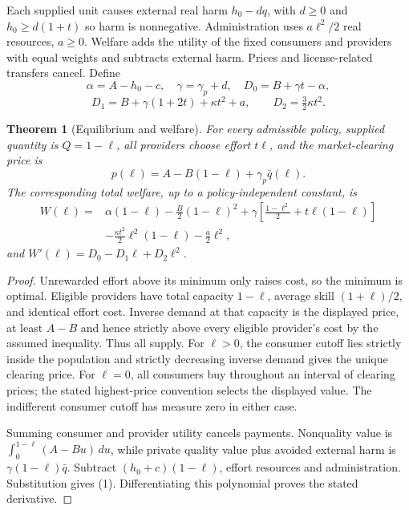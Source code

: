 \documentclass[11pt,a4paper]{article}
\newtheorem{theorem}{Theorem}[section]
\theoremstyle{definition}
\theoremstyle{remark}
\begin{document}
Each supplied unit causes external real harm $h_0-dq$, with $d\geq0$ and $h_0\geq d(1+t)$ so harm is nonnegative. Administration uses $a\ell^2/2$ real resources, $a\geq0$. Welfare adds the utility of the fixed consumers and providers with equal weights and subtracts external harm. Prices and license-related transfers cancel. Define
\[
 \alpha=A-h_0-c,\quad \gamma=\gamma_p+d,\quad
 D_0=B+\gamma t-\alpha,
\]
\[
 D_1=B+\gamma(1+2t)+\kappa t^2+a,\qquad D_2=\tfrac32\kappa t^2.
\]

\begin{theorem}[Equilibrium and welfare]
For every admissible policy, supplied quantity is $Q=1-\ell$, all providers choose effort $t\ell$, and the market-clearing price is
\[
 p(\ell)=A-B(1-\ell)+\gamma_p\bar q(\ell).
\]
The corresponding total welfare, up to a policy-independent constant, is
\[
 \begin{split}
 W(\ell)={}&\alpha(1-\ell)-\frac B2(1-\ell)^2
 +\gamma\left[\frac{1-\ell^2}{2}+t\ell(1-\ell)\right]\\
 &-\frac{\kappa t^2}{2}\ell^2(1-\ell)-\frac a2\ell^2,
 \end{split}\tag{1}
\]
and $W'(\ell)=D_0-D_1\ell+D_2\ell^2$.
\end{theorem}
\begin{proof}
Unrewarded effort above its minimum only raises cost, so the minimum is optimal. Eligible providers have total capacity $1-\ell$, average skill $(1+\ell)/2$, and identical effort cost. Inverse demand at that capacity is the displayed price, at least $A-B$ and hence strictly above every eligible provider's cost by the assumed inequality. Thus all supply. For $\ell>0$, the consumer cutoff lies strictly inside the population and strictly decreasing inverse demand gives the unique clearing price. For $\ell=0$, all consumers buy throughout an interval of clearing prices; the stated highest-price convention selects the displayed value. The indifferent consumer cutoff has measure zero in either case.

Summing consumer and provider utility cancels payments. Nonquality value is $\int_0^{1-\ell}(A-Bu)\,du$, while private quality value plus avoided external harm is $\gamma(1-\ell)\bar q$. Subtract $(h_0+c)(1-\ell)$, effort resources and administration. Substitution gives (1). Differentiating this polynomial proves the stated derivative.
\end{proof}
\end{document}
